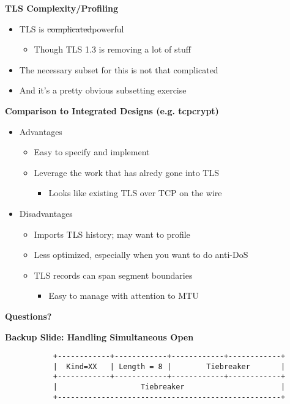\documentclass[helvetica]{seminar}
\newcommand{\heading}[1]{%
  \begin{center} 
    \large\bf 
    #1 
  \end{center} 
  \vspace{.4 in}}
\begin{document}
\begin{slide}
\heading{TLS Complexity/Profiling}

\begin{itemize}
\item TLS is \sout{complicated}powerful
  \begin{itemize}
    \item Though TLS 1.3 is removing a lot of stuff
  \end{itemize}
\item The necessary subset for this is not that complicated
\item And it's a pretty obvious subsetting exercise
\end{itemize}
\end{slide}


\begin{slide}
\heading{Comparison to Integrated Designs (e.g. tcpcrypt)}

\begin{itemize}
\item Advantages
  \begin{itemize}
  \item Easy to specify and implement
  \item Leverage the work that has alredy gone into TLS 
    \begin{itemize}
    \item Looks like existing TLS over TCP on the wire
    \end{itemize}
\end{itemize}

\item Disadvantages
\begin{itemize}
\item Imports TLS history; may want to profile
\item Less optimized, especially when you want to do anti-DoS
\item TLS records can span segment boundaries 
  \begin{itemize}
  \item Easy to manage with attention to MTU
  \end{itemize}
\end{itemize}
\end{itemize}
\end{slide}


\begin{slide}
\heading{Questions?}

\end{slide}

\begin{slide}
\heading{Backup Slide: Handling Simultaneous Open}

\begin{verbatim}
           +------------+------------+------------+------------+
           |  Kind=XX   | Length = 8 |        Tiebreaker       |
           +------------+------------+------------+------------+
           |                   Tiebreaker                      |
           +---------------------------------------------------+
\end{verbatim}
\end{slide}
\end{document}
